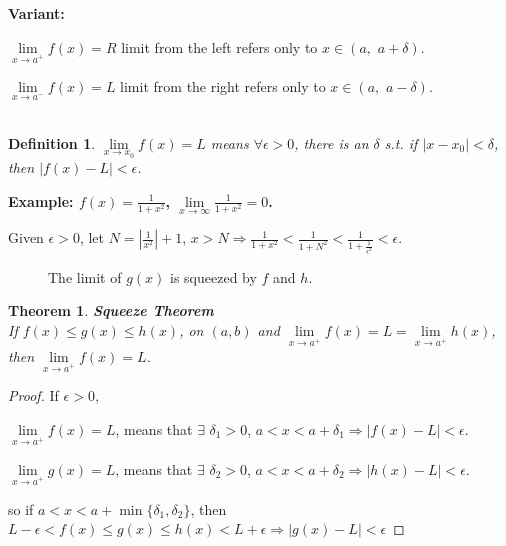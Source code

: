 \documentclass[12pt]{article}
\newcommand{\abs}[1]{\left| #1 \right|}
\theoremstyle{plain}
\newtheorem{theorem}{Theorem}[subsection]
\newtheorem{definition}{Definition}[subsection]
\newcommand{\dlim}{\displaystyle\lim\limits}
\begin{document}
    \textbf{Variant:}
    \begin{description}
        \item $\dlim_{x\to a^+} f(x)=R$ limit from the left
                refers only to $x\in (a,\,\, a+\delta)$.
        \item $\dlim_{x\to a^-} f(x)=L$ limit from the right
                refers only to $x\in (a,\,\, a-\delta)$.\\\\
    \end{description}


    \begin{definition}
        $\dlim_{x\to x_0} f(x) = L$ means $\forall \epsilon >0$, there
        is an $\delta$ s.t. if $\abs{x-x_0}<\delta$,
        then $\abs{f(x)-L}<\epsilon$.
    \end{definition}
    {\color{Brown}\textbf{Example: $f(x)=\frac1{1+x^2}$, 
    $\dlim_{x\to\infty} \frac1{1+x^2} =0$.}

    Given $\epsilon > 0$, let $N=\abs{\frac1{x^2}}+1$, 
    $x>N \Rightarrow \frac1{1+x^2}<\frac1{1+N^2}
    <\frac1{1+\frac1{\epsilon^2}}<\epsilon$.}

    \begin{figure}[htbp]
    	\centering
    	\caption{The limit of $g(x)$ is squeezed by $f$ and $h$.}
    \end{figure}

    \begin{theorem}\textbf{Squeeze Theorem}\\
        If $f(x)\leq g(x)\leq h(x)$, on $(a,b)$ 
        and $\dlim_{x\to a^+}f(x)=L=\dlim_{x\to a^+} h(x)$,
        then $\dlim_{x\to a^+}f(x) = L$.
    \end{theorem}
    \begin{proof}
        If $\epsilon>0$, 
        \begin{description}
            \item $\dlim_{x\to a^+} f(x)=L$, means that 
            $\exists\,\, \delta_1>0$, $a<x<a+\delta_1 \Rightarrow \abs{f(x)-L}<\epsilon$.
            \item $\dlim_{x\to a^+} g(x)=L$, means that 
            $\exists\,\, \delta_2>0$, $a<x<a+\delta_2 \Rightarrow \abs{h(x)-L}<\epsilon$.
        \end{description}
        so if $a<x<a+\min\{\delta_1, \delta_2\}$, 
        then $L-\epsilon<f(x)\leq g(x)\leq h(x)<L+\epsilon \Rightarrow \abs{g(x)-L}<\epsilon$
    \end{proof}
\end{document}
